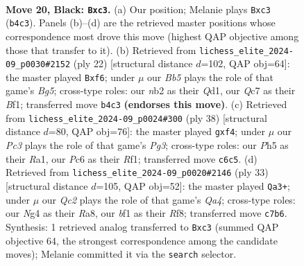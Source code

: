 \documentclass[11pt]{article}
\begin{document}
\begin{figure}[p]\centering
\begin{subfigure}{0.46\textwidth}\centering
\resizebox{\linewidth}{!}{%
\newchessgame
\chessboard[
  setfen={2r1b1k1/p1qr1pp1/n1p1p3/1P5p/1b1P1Pn1/1PNQ2P1/1N2P2P/R1B1RBK1 b - - 0 20},
  showmover=false,
  pgfstyle=straightmove, color=movearrow, markmove={b4-c3}
]}
\caption{}
\end{subfigure}\hfill
\begin{subfigure}{0.46\textwidth}\centering
\resizebox{\linewidth}{!}{%
\newchessgame
\chessboard[
  setfen={1r1qkb1r/1p3ppp/p2pbn2/4p1B1/PnN1P3/2N5/1PP2PPP/R2QKB1R w KQk - 1 12},
  showmover=false,
  pgfstyle=straightmove, color=movearrow, markmove={g5-f6}
]}
\caption{}
\end{subfigure}
\\[4pt]
\begin{subfigure}{0.46\textwidth}\centering
\resizebox{\linewidth}{!}{%
\newchessgame
\chessboard[
  setfen={r1b1rbk1/2pq3p/p1p1npp1/Np6/P3Pp2/3PN1P1/1PPB3P/R2Q1R1K w - - 0 20},
  showmover=false,
  pgfstyle=straightmove, color=movearrow, markmove={g3-f4}
]}
\caption{}
\end{subfigure}\hfill
\begin{subfigure}{0.46\textwidth}\centering
\resizebox{\linewidth}{!}{%
\newchessgame
\chessboard[
  setfen={r4rk1/p2p2pp/b1p1pp2/q2nP3/1bP2P2/1PN3Q1/PK1B2PP/3R1B1R b - - 1 17},
  showmover=false,
  pgfstyle=straightmove, color=movearrow, markmove={a5-a3}
]}
\caption{}
\end{subfigure}
\caption{\textbf{Move 20, Black: \texttt{Bxc3}.} (a) Our position; Melanie plays \texttt{Bxc3} (\texttt{b4c3}). Panels (b)--(d) are the retrieved master positions whose correspondence most drove this move (highest QAP objective among those that transfer to it). (b) Retrieved from \texttt{lichess\_elite\_2024-09\_p0030\#2152} (ply 22) [structural distance $d$=102, QAP obj=64]: the master played \texttt{Bxf6}; under $\mu$ our \emph{Bb5} plays the role of that game's \emph{Bg5}; cross-type roles: our \emph{n}b2 as their \emph{Q}d1, our \emph{Q}c7 as their \emph{B}f1; transferred move \texttt{b4c3} \textbf{(endorses this move)}. (c) Retrieved from \texttt{lichess\_elite\_2024-09\_p0024\#300} (ply 38) [structural distance $d$=80, QAP obj=76]: the master played \texttt{gxf4}; under $\mu$ our \emph{Pc3} plays the role of that game's \emph{Pg3}; cross-type roles: our \emph{P}h5 as their \emph{R}a1, our \emph{P}c6 as their \emph{R}f1; transferred move \texttt{c6c5}. (d) Retrieved from \texttt{lichess\_elite\_2024-09\_p0020\#2146} (ply 33) [structural distance $d$=105, QAP obj=52]: the master played \texttt{Qa3+}; under $\mu$ our \emph{Qc2} plays the role of that game's \emph{Qa4}; cross-type roles: our \emph{N}g4 as their \emph{R}a8, our \emph{b}f1 as their \emph{R}f8; transferred move \texttt{c7b6}. Synthesis: 1 retrieved analog transferred to \texttt{Bxc3} (summed QAP objective 64, the strongest correspondence among the candidate moves); Melanie committed it via the \texttt{search} selector.}
\label{fig:thought-m39}
\end{figure}
\end{document}
